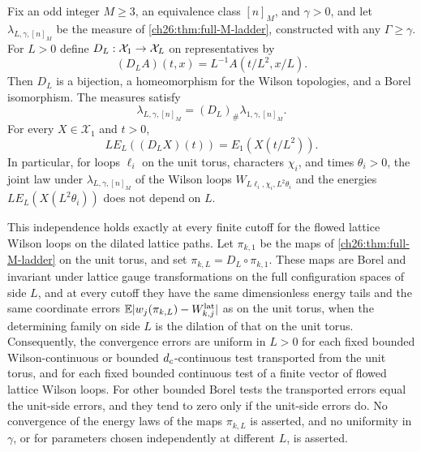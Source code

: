 \begin{theorem}\label{ch26:thm:exact-L-dilation}
Fix an odd integer $M\ge3$, an equivalence class $[n]_M$, and $\gamma>0$, and let $\lambda_{L,\gamma,[n]_M}$ be the measure of \cref{ch26:thm:full-M-ladder}, constructed with any $\Gamma\ge\gamma$. For $L>0$ define $D_L:\mathcal X_1\to\mathcal X_L$ on representatives by
\[
 (D_LA)(t,x)=L^{-1}A(t/L^2,x/L).
\]
Then $D_L$ is a bijection, a homeomorphism for the Wilson topologies, and a Borel isomorphism. The measures satisfy
\begin{equation}\label{ch26:eq:dilated-orbit-law}
 \lambda_{L,\gamma,[n]_M}=(D_L)_\#\lambda_{1,\gamma,[n]_M}.
\end{equation}
For every $X\in\mathcal X_1$ and $t>0$,
\begin{equation}\label{ch26:eq:dilated-energy}
 LE_L((D_LX)(t))=E_1(X(t/L^2)).
\end{equation}
In particular, for loops $\ell_i$ on the unit torus, characters $\chi_i$, and times $\theta_i>0$, the joint law under $\lambda_{L,\gamma,[n]_M}$ of the Wilson loops $W_{L\ell_i,\chi_i,L^2\theta_i}$ and the energies $LE_L(X(L^2\theta_i))$ does not depend on $L$.

This independence holds exactly at every finite cutoff for the flowed lattice Wilson loops on the dilated lattice paths. Let $\pi_{k,1}$ be the maps of \cref{ch26:thm:full-M-ladder} on the unit torus, and set $\pi_{k,L}=D_L\circ\pi_{k,1}$. These maps are Borel and invariant under lattice gauge transformations on the full configuration spaces of side $L$, and at every cutoff they have the same dimensionless energy tails and the same coordinate errors $\mathbb E|w_j(\pi_{k,L})-W^{\mathrm{lat}}_{k,j}|$ as on the unit torus, when the determining family on side $L$ is the dilation of that on the unit torus. Consequently, the convergence errors are uniform in $L>0$ for each fixed bounded Wilson-continuous or bounded $d_c$-continuous test transported from the unit torus, and for each fixed bounded continuous test of a finite vector of flowed lattice Wilson loops. For other bounded Borel tests the transported errors equal the unit-side errors, and they tend to zero only if the unit-side errors do. No convergence of the energy laws of the maps $\pi_{k,L}$ is asserted, and no uniformity in $\gamma$, or for parameters chosen independently at different $L$, is asserted.
\end{theorem}

